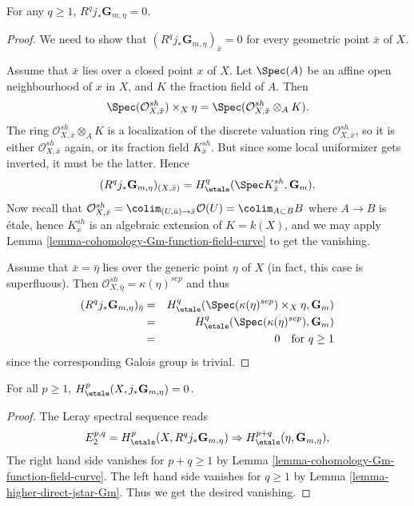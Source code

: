 \begin{lemma}
\label{lemma-higher-direct-jstar-Gm}
For any $q \geq 1$, $R^q j_*\mathbf{G}_{m, \eta} = 0$.
\end{lemma}

\begin{proof}
We need to show that $(R^q j_*\mathbf{G}_{m, \eta})_{\bar x} = 0$ for every
geometric point $\bar x$ of $X$.

\medskip\noindent
Assume that $\bar x$ lies over a closed point $x$ of $X$. Let $\Spec(A)$
be an affine open neighbourhood of $x$ in $X$, and $K$ the fraction field
of $A$. Then
$$
\Spec(\mathcal{O}^{sh}_{X, \bar x}) \times_X \eta =
\Spec(\mathcal{O}^{sh}_{X, \bar x} \otimes_A K).
$$
The ring $\mathcal{O}^{sh}_{X, \bar x} \otimes_A K$ is a localization of
the discrete valuation ring $\mathcal{O}^{sh}_{X, \bar x}$, so it is either
$\mathcal{O}^{sh}_{X, \bar x}$ again, or its fraction field
$K^{sh}_{\bar x}$. But since some local uniformizer gets inverted, it must
be the latter. Hence
$$
(R^q j_*\mathbf{G}_{m, \eta})_{(X, \bar x)} = H_\etale^q(\Spec
K^{sh}_{\bar x}, \mathbf{G}_m).
$$
Now recall that $\mathcal{O}^{sh}_{X, \bar x} =
\colim_{(U, \bar u) \to \bar x} \mathcal{O}(U) = \colim_{A \subset B} B$
where $A \to B$ is \'etale, hence $K^{sh}_{\bar x}$ is an algebraic
extension of $K = k(X)$, and we may apply
Lemma \ref{lemma-cohomology-Gm-function-field-curve}
to get the vanishing.

\medskip\noindent
Assume that $\bar x = \bar \eta$ lies over the generic point $\eta$ of $X$ (in
fact, this case is superfluous). Then
$\mathcal{O}^{sh}_{X, \bar \eta} = \kappa(\eta)^{sep}$ and thus
\begin{eqnarray*}
(R^q j_*\mathbf{G}_{m, \eta})_{\bar \eta}
& = &
H_\etale^q(\Spec(\kappa(\eta)^{sep}) \times_X \eta, \mathbf{G}_m) \\
& = & H_\etale^q (\Spec(\kappa(\eta)^{sep}), \mathbf{G}_m) \\
& = & 0 \ \ \text{ for } q \geq 1
\end{eqnarray*}
since the corresponding Galois group is trivial.
\end{proof}

\begin{lemma}
\label{lemma-cohomology-jstar-Gm}
For all $p \geq 1$, $H_\etale^p(X, j_*\mathbf{G}_{m, \eta}) = 0$.
\end{lemma}

\begin{proof}
The Leray spectral sequence reads
$$
E_2^{p, q} = H_\etale^p(X, R^qj_*\mathbf{G}_{m, \eta}) \Rightarrow
H_\etale^{p+q}(\eta, \mathbf{G}_{m, \eta}),
$$
The right hand side vanishes for $p + q \geq 1$ by
Lemma \ref{lemma-cohomology-Gm-function-field-curve}.
The left hand side vanishes for $q \geq 1$ by
Lemma \ref{lemma-higher-direct-jstar-Gm}. Thus we get the desired vanishing.
\end{proof}

